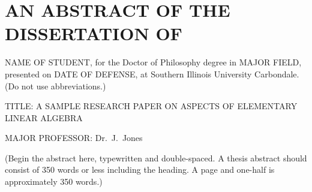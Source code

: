 


\chapter*{AN ABSTRACT OF THE DISSERTATION OF}

NAME OF STUDENT, for the Doctor of Philosophy degree in MAJOR FIELD,
presented on DATE OF DEFENSE, at Southern Illinois University Carbondale.
(Do not use abbreviations.)

\vspace{14pt}
\noindent
TITLE: A SAMPLE RESEARCH PAPER ON ASPECTS OF ELEMENTARY \\
LINEAR ALGEBRA

\vspace{14pt}

\noindent
MAJOR PROFESSOR: Dr.\ J.\ Jones

\vspace{14pt}


   (Begin the abstract here, typewritten and double-spaced.
A thesis abstract should consist of 350 words or less including the heading. A page and one-half is approximately 350 words.)

\newpage


